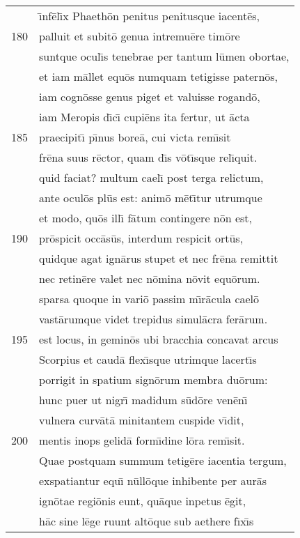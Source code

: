 \documentclass[paper=6in:9in,pagesize=pdftex,
               headinclude=on,footinclude=on,12pt]{scrbook}
\begin{document}
\begin{longtable}[p]{ r l }
 & \={\i}nf\=el\={\i}x Phaeth\=on penitus penitusque iacent\=es,\\ 
180 & palluit et subit\=o genua intremu\=ere tim\=ore\\ 
 & suntque ocul\={\i}s tenebrae per tantum l\=umen obortae,\\ 
 & et iam m\=allet equ\=os numquam tetigisse patern\=os,\\ 
 & iam cogn\=osse genus piget et valuisse rogand\=o,\\ 
 & iam Meropis d\={\i}c\={\i} cupi\=ens ita fertur, ut \=acta\\ 
185 & praecipit\={\i} p\={\i}nus bore\=a, cui victa rem\={\i}sit\\ 
 & fr\=ena suus r\=ector, quam d\={\i}s v\=ot\={\i}sque rel\={\i}quit.\\ 
 & quid faciat? multum cael\={\i} post terga relictum,\\ 
 & ante ocul\=os pl\=us est: anim\=o m\=et\={\i}tur utrumque\\ 
 & et modo, qu\=os ill\={\i} f\=atum contingere n\=on est,\\ 
190 & pr\=ospicit occ\=as\=us, interdum respicit ort\=us,\\ 
 & quidque agat ign\=arus stupet et nec fr\=ena remittit\\ 
 & nec retin\=ere valet nec n\=omina n\=ovit equ\=orum.\\ 
 & sparsa quoque in vari\=o passim m\={\i}r\=acula cael\=o\\ 
 & vast\=arumque videt trepidus simul\=acra fer\=arum.\\ 
195 & est locus, in gemin\=os ubi bracchia concavat arcus\\ 
 & Scorpius et caud\=a flex\={\i}sque utrimque lacert\={\i}s\\ 
 & porrigit in spatium sign\=orum membra du\=orum:\\ 
 & hunc puer ut nigr\={\i} madidum s\=ud\=ore ven\=en\={\i}\\ 
 & vulnera curv\=at\=a minitantem cuspide v\={\i}dit,\\ 
200 & mentis inops gelid\=a form\={\i}dine l\=ora rem\={\i}sit.\\ 
 & \indent Quae postquam summum tetig\=ere iacentia tergum,\\ 
 & exspatiantur equ\={\i} n\=ull\=oque inhibente per aur\=as\\ 
 & ign\=otae regi\=onis eunt, qu\=aque inpetus \=egit,\\ 
 & h\=ac sine l\=ege ruunt alt\=oque sub aethere f\={\i}x\={\i}s\\ 

\end{longtable}
\end{document}

